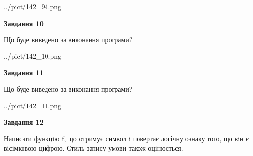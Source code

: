 \documentclass[12pt, ukrainian]{article}
\begin{document}
{\begin {large}
\begin{center}
	{../pict/142_94.png}
\end{center}
\newpage

{\begin {center}\textbf{Завдання 10}\end {center}}

Що буде виведено за виконання програми?\par
\begin{center}
	{../pict/142_10.png}
\end{center}
\newpage

{\begin {center}\textbf{Завдання 11}\end {center}}

Що буде виведено за виконання програми?\par
\begin{center}
	{../pict/142_11.png}
\end{center}
\newpage

{\begin {center}\textbf{Завдання 12}\end {center}}


Написати функцiю f, що отримує символ i повертає логічну ознаку того, що вiн є вісімковою цифрою. Стиль запису умови також оцінюється.\par
\newpage

\end {large}}
\end{document}
